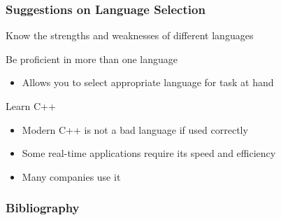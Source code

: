 \documentclass[xetex,professionalfont]{beamer}
\begin{document}

\begin{frame}
\frametitle{Suggestions on Language Selection}

Know the strengths and weaknesses of different languages

\bigskip
Be proficient in more than one language
\begin{itemize}
	\item Allows you to select appropriate language for task at hand
\end{itemize}

\bigskip
Learn C++
\begin{itemize}
	\item Modern C++ is not a bad language if used correctly
	\item Some real-time applications require its speed and efficiency
	\item Many companies use it
\end{itemize}

\end{frame}


\begin{frame}
\frametitle{Bibliography}

\printbibliography

\end{frame}
\end{document}
